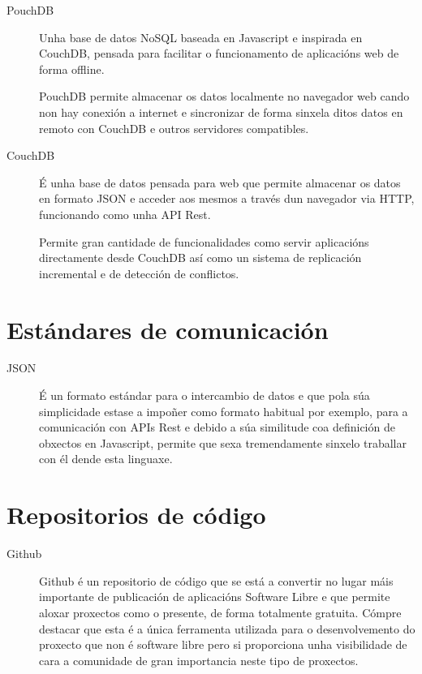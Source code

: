   \begin{description}
     \item [PouchDB] Unha base de datos NoSQL baseada en Javascript e inspirada 
en CouchDB, pensada para facilitar o funcionamento de aplicacións web de forma 
offline.

PouchDB permite almacenar os datos localmente no navegador web cando non 
hay conexión a internet e sincronizar de forma sinxela ditos datos en remoto con 
CouchDB e outros servidores compatibles.

   \item [CouchDB] É unha base de datos pensada para web que permite almacenar 
os datos en formato JSON e acceder aos mesmos a través dun navegador via HTTP, 
funcionando como unha API Rest.

    Permite gran cantidade de funcionalidades como servir aplicacións 
directamente desde CouchDB así como un sistema de replicación incremental e de 
detección de conflictos.

  \end{description}

  \section{Estándares de comunicación}

  \begin{description}
   \item [JSON] É un formato estándar para o intercambio de datos e que pola súa 
simplicidade estase a impoñer como formato habitual por exemplo, para a comunicación con 
APIs Rest e debido a súa similitude coa definición de obxectos en Javascript, permite que 
sexa tremendamente sinxelo traballar con él dende esta linguaxe.
  \end{description}

  \section{Repositorios de código}

  \begin{description}
   \item [Github] Github é un repositorio de código que se está a convertir no lugar máis 
importante de publicación de aplicacións Software Libre e que permite aloxar proxectos 
como o presente, de forma totalmente gratuita.
  Cómpre destacar que esta é a única ferramenta utilizada para o desenvolvemento do 
proxecto que non é software libre pero si proporciona unha visibilidade de cara a 
comunidade de gran importancia neste tipo de proxectos.
  \end{description}

